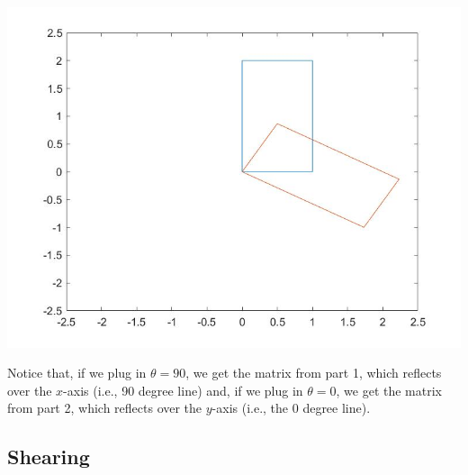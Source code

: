 \begin{sol}
\begin{enumerate}
    \begin{center}
        \includegraphics[width=.75\textwidth]{FacesDay2/figs/reflect.jpg}
        \label{fig:reflect}
    \end{center}
    Notice that, if we plug in $\theta=90$, we get the matrix from part 1, which reflects over the $x$-axis (i.e., 90 degree line) and, if we plug in $\theta=0$, we get the matrix from part 2, which reflects over the $y$-axis (i.e., the 0 degree line).
\end{enumerate}
\end{sol}

\subsection{Shearing}

